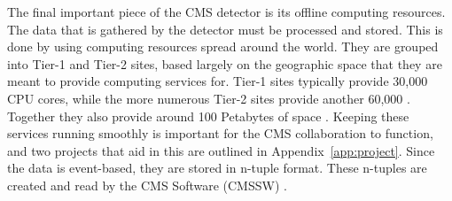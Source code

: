 The final important piece of the CMS detector is its offline computing resources.
The data that is gathered by the detector must be processed and stored.
This is done by using computing resources spread around the world.
They are grouped into Tier-1 and Tier-2 sites,
based largely on the geographic space that they are meant to provide computing services for.
Tier-1 sites typically provide 30,000 CPU cores, while the more numerous Tier-2 sites provide
another 60,000 \cite{Bloom_2017}.
Together they also provide around 100 Petabytes of space \cite{Ratnikova_2014}.
Keeping these services running smoothly is important for the CMS collaboration to function,
and two projects that aid in this are outlined in Appendix~\ref{app:project}.
Since the data is event-based, they are stored in n-tuple format.
These n-tuples are created and read by the CMS Software (CMSSW) \cite{INNOCENTE200131}.
